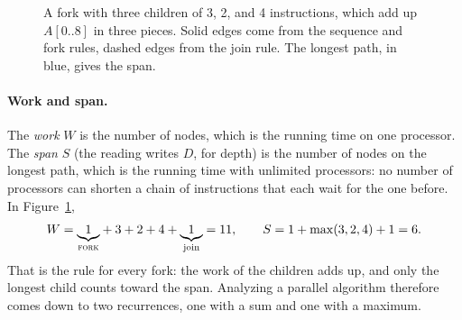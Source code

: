 \begin{figure}[ht]
  \centering
  \caption{A fork with three children of 3, 2, and 4 instructions, which add up $A[0..8]$ in three pieces. Solid edges come from the sequence and fork rules, dashed edges from the join rule. The longest path, in blue, gives the span.}
  \label{fig:fork3}
\end{figure}

\paragraph{Work and span.} The \emph{work} $W$ is the number of nodes, which is the running time on one processor. The \emph{span} $S$ (the reading writes $D$, for depth) is the number of nodes on the longest path, which is the running time with unlimited processors: no number of processors can shorten a chain of instructions that each wait for the one before. In Figure~\ref{fig:fork3},
\[
  W = {\underbrace{1}_{\textsc{fork}}} + 3 + 2 + 4 + {\underbrace{1}_{\text{join}}} = 11,
  \qquad
  S = 1 + \max(3, 2, 4) + 1 = 6.
\]
That is the rule for every fork: the work of the children adds up, and only the longest child counts toward the span. Analyzing a parallel algorithm therefore comes down to two recurrences, one with a sum and one with a maximum.

